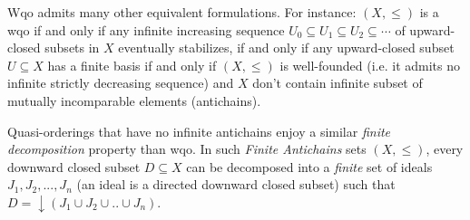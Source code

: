 Wqo admits many other equivalent formulations. For instance: 
$(X,\leq)$ is a wqo if and only if any infinite increasing sequence $U_0 \subseteq U_1 \subseteq U_2 \subseteq \cdots$ of
upward-closed subsets in $X$ eventually stabilizes, 
if and only if any upward-closed subset $U \subseteq X$ has a
finite basis if and only if $(X,\leq)$ is well-founded (i.e. it admits no infinite strictly decreasing sequence) and $X$ don't contain infinite subset of mutually incomparable elements (antichains).
%
\iffalse
%

\begin{lemma}{(Higman [40])} 
If $\leq$ is a wqo then any upward-closed $I$ has a
finite basis.
\end{lemma}


\begin{proof}
The set of minimal elements of $I$ is a basis because $\leq$ is well-founded. It
only contains a finite number of non-equivalent elements otherwise they would make
an infinite sequence contradicting the wqo assumption.
\end{proof}



\begin{lemma}  \label{upward-closed stablizes}
If $\leq$ is a wqo then any infinite increasing sequence $I_0 \subseteq I_1 \subseteq I_2 \subseteq \cdots$ of
upward-closed sets eventually stabilizes, i.e. there is a $k \in N$ such that 
$I_k = I_{k+1} = I_{k+2} = \cdots $.
\end{lemma}

\begin{proof}
Assue we have a counter-example.
We extract an infinite subsequence where
inclusion is strict: $I_{n_0} \subsetneq I_{n_1} \subsetneq I_{n_2} \cdots$. Now, for any $i>0$, we can pick some $x_i \in I_{n_i} \setminus I_{n_{i-1}}$. The well-quasi-ordering hypothesis means that the infinite sequence of $x_i$'s
contains an increasing pair $x_i \leq x_j$ for some $i<j$. Because $x_i$ belongs to an upward-
closed set $I_{n_i}$ we have $x_j \in I_{n_i} $, contradicting $x_j \not\in I_{n_{ j - 1}}$.
\end{proof}
%
\fi
%

Quasi-orderings that have no infinite antichains enjoy a similar \emph{finite decomposition} property than wqo. In such \emph{Finite Antichains} sets $(X,\leq)$, every downward closed subset $D \subseteq X$ can be decomposed into a \emph{finite} set of ideals $J_1, J_2,..., J_n$ (an ideal is a directed downward closed subset) such that $D = \downarrow (J_1 \cup J_2 \cup..\cup J_n)$.

